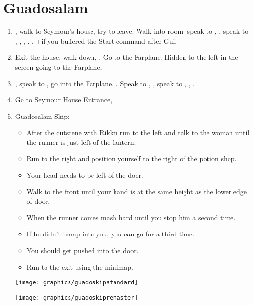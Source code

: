 \chapter{Guadosalam}\label{ch:guadosalam}

\begin{enumerate}
	\item \sd, walk to Seymour's house, try to leave. Walk into room, speak to \auron, \sd, speak to \wakka, \lulu, \rikku, \yuna. \sd, \skippablefmv+\cs[5:50] if you buffered the Start command after Gui.
	\item Exit the house, walk down, \sd. Go to the Farplane. Hidden to the left in the screen going to the Farplane, 
	\item \sd, speak to \auron, go into the Farplane. \cs[1:20]. Speak to \wakka, \sd, speak to \yuna, \cs[2:10], \sd.
	\item Go to Seymour House Entrance, \sd
	\bothcb \wincb \losscb
	\item Guadosalam Skip:
	      \begin{itemize}
		      \item After the cutscene with Rikku run to the left and talk to the woman until the runner is just left of the lantern.
			  \item Run to the right and position yourself to the right of the potion shop.
			  \item Your head needs to be left of the door.
			  \item Walk to the front until your hand is at the same height as the lower edge of door.
			  \item When the runner comes mash hard until you stop him a second time.
			  \item If he didn't bump into you, you can go for a third time.
			  \item You should get pushed into the door.
		      \item Run to the exit using the minimap.
	      \end{itemize}
	      \texttt{[image: graphics/guadoskipstandard]}

	      \texttt{[image: graphics/guadoskipremaster]}
\end{enumerate}